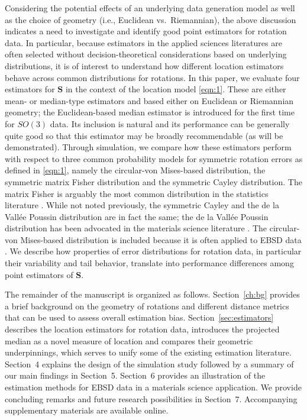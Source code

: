Considering the potential effects of an underlying data generation model as well as the choice of geometry (i.e., Euclidean vs.~Riemannian), the above discussion indicates a need to investigate and identify good point estimators for rotation data.  In particular, because estimators in the applied sciences literatures are often selected without decision-theoretical considerations based on underlying distributions, it is of interest to understand how different location estimators behave across common distributions for rotations.  In this paper, we evaluate four estimators for $\bm S$ in the context of the location model \eqref{eqn:1}. These are either mean- or median-type estimators and based either on Euclidean or Riemannian geometry; the Euclidean-based median estimator is introduced for the first time for $SO(3)$ data. Its inclusion is natural and its performance can be generally quite good so that this estimator may be broadly recommendable (as will be demonstrated).   Through simulation, we compare how these estimators perform with respect to three common probability models for symmetric rotation errors as defined in \eqref{eqn:1}, namely the circular-von Mises-based distribution, the symmetric matrix Fisher distribution and the symmetric Cayley distribution.  The matrix Fisher is arguably the most common distribution in the statistics literature \citep[see][]{chikuse03}. While not noted previously, the symmetric Cayley and the de la Vall\'{e}e Poussin distribution are in fact the same; the de la Vall\'{e}e Poussin distribution has been advocated in the materials science literature \citep{Schaeben97}.  The circular-von Mises-based distribution is included because it is often applied to EBSD data \citep{bingham09}.  We describe how properties of error distributions for rotation data, in particular their variability and tail behavior, translate into performance differences among point estimators of $\bm S$.

The remainder of the manuscript is organized  as follows.  Section~\ref{ch:bg} provides a brief background on the geometry of rotations and different distance metrics that can be used to assess overall estimation bias.   Section~\ref{sec:estimators} describes the location estimators for rotation data, introduces the projected median as a novel measure of location  and compares their geometric underpinnings, which serves to unify some of the existing estimation literature.  Section~4 explains the design of the simulation study followed by a summary of our main findings in Section~5. Section~6 provides an illustration of the estimation methods for EBSD data in a materials science application. We provide concluding remarks and future research possibilities in Section~7. Accompanying supplementary materials are available online.
